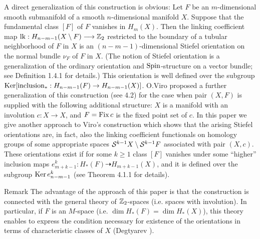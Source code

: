 \documentclass{article}
\begin{document}
A direct generalization of this construction is obvious: Let $F$ be
an $m$-dimensional smooth submanifold of a smooth $n$-dimensional
manifold $X$. Suppose that the fundamental class $[F]$ of $F$ vanishes
in $H_m(X)$. Then the linking coefficient map
$\operatorname{lk}:H_{n-m-1}(X\setminus F)\longrightarrow\mathbb Z_2$ restricted to the
boundary of a tubular neighborhood of $F$ in $X$ is an
$(n-m-1)$-dimensional Stiefel orientation on the normal bundle
$\nu_F$ of $F$ in $X$. (The notion of Stiefel orientation is a
generalization of the ordinary orientation and $\mathrm{Spin}$-structure on
a vector bundle; see Definition 1.4.1 for details.) This orientation
is well defined over the subgroup 
$\operatorname{Ker}[\operatorname{inclusion}_*:H_{n-m-1}(F)\to H_{n-m-1}(X)]$. O.Viro \cite{8} proposed
a further generalization of this construction (see 4.2) for the case
when pair  $(X,F)$  is  supplied  with  the  following  additional 
structure:
$X$ is a manifold with an involution $c:X\to X$, and $F=\operatorname{Fix} c$ is
the fixed point set of $c$. In this paper we give another approach
to Viro's construction which shows that the arising Stiefel orientations
are, in fact, also the linking coefficient functionals on homology
groups of some appropriate spaces $\mathcal S^{k-1}X\setminus \mathcal S^{k-1}F$
associated with pair $(X,c)$. These orientations exist if for some
$k\ge1$ class $[F]$ vanishes under some ``higher'' inclusion maps
$e_{m+k-1}^k:H_*(F)\dashrightarrow H_{m+k-1}(X)$, and it is defined over
the subgroup $\operatorname{Ker} e_{n-m-1}^k$ (see Theorem 4.1.1 for details).
\begin{remark}{{Remark} The advantage of the approach of this paper is
that the construction is connected with the general theory of
$\mathbb Z_2$-spaces (i.e. spaces with involution). In particular, if $F$
is an $M$-space (i.e. $\dim H_*(F)=\dim H_*(X)$), this theory enables
to express the condition necessary for existence of the orientations
in terms of characteristic classes of $X$ (Degtyarev \cite{3}).
}\end{remark}
\end{document}
